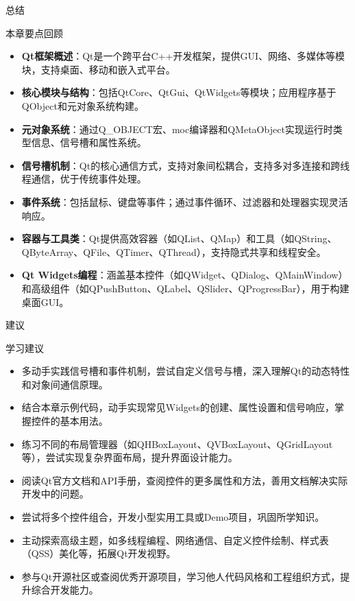 \documentclass[UTF8,aspectratio=169]{beamer}
\begin{document}
\begin{frame}{总结}
    \begin{ytublock}{本章要点回顾}
        \begin{itemize}
            \item \textbf{Qt框架概述}：Qt是一个跨平台C++开发框架，提供GUI、网络、多媒体等模块，支持桌面、移动和嵌入式平台。
            \item \textbf{核心模块与结构}：包括QtCore、QtGui、QtWidgets等模块；应用程序基于QObject和元对象系统构建。
            \item \textbf{元对象系统}：通过Q\_OBJECT宏、moc编译器和QMetaObject实现运行时类型信息、信号槽和属性系统。
            \item \textbf{信号槽机制}：Qt的核心通信方式，支持对象间松耦合，支持多对多连接和跨线程通信，优于传统事件处理。
            \item \textbf{事件系统}：包括鼠标、键盘等事件；通过事件循环、过滤器和处理器实现灵活响应。
            \item \textbf{容器与工具类}：Qt提供高效容器（如QList、QMap）和工具（如QString、QByteArray、QFile、QTimer、QThread），支持隐式共享和线程安全。
            \item \textbf{Qt Widgets编程}：涵盖基本控件（如QWidget、QDialog、QMainWindow）和高级组件（如QPushButton、QLabel、QSlider、QProgressBar），用于构建桌面GUI。
        \end{itemize}
    \end{ytublock}
\end{frame}


\begin{frame}{建议}
    \begin{ytublock}{学习建议}
        \begin{itemize}
            \item 多动手实践信号槽和事件机制，尝试自定义信号与槽，深入理解Qt的动态特性和对象间通信原理。
            \item 结合本章示例代码，动手实现常见Widgets的创建、属性设置和信号响应，掌握控件的基本用法。
            \item 练习不同的布局管理器（如QHBoxLayout、QVBoxLayout、QGridLayout等），尝试实现复杂界面布局，提升界面设计能力。
            \item 阅读Qt官方文档和API手册，查阅控件的更多属性和方法，善用文档解决实际开发中的问题。
            \item 尝试将多个控件组合，开发小型实用工具或Demo项目，巩固所学知识。
            \item 主动探索高级主题，如多线程编程、网络通信、自定义控件绘制、样式表（QSS）美化等，拓展Qt开发视野。
            \item 参与Qt开源社区或查阅优秀开源项目，学习他人代码风格和工程组织方式，提升综合开发能力。
        \end{itemize}
    \end{ytublock}
\end{frame}
\end{document}
